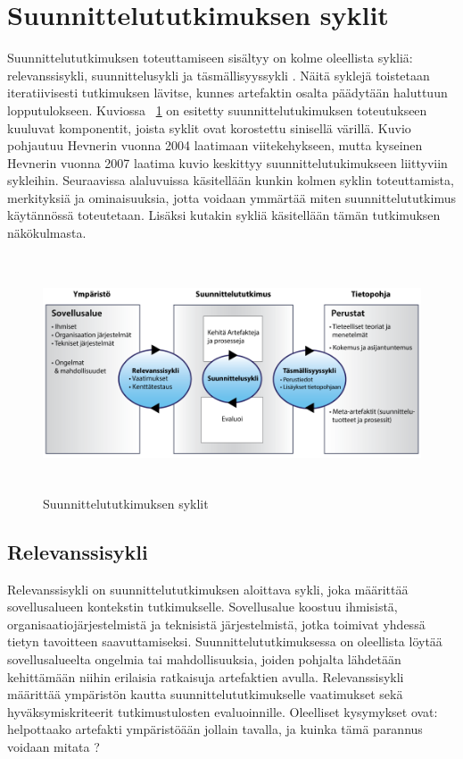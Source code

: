 \documentclass[utf8]{gradu3}
\begin{document}
%

\section{Suunnittelututkimuksen syklit}

Suunnittelututkimuksen toteuttamiseen sisältyy on kolme oleellista sykliä: relevanssisykli, suunnittelusykli ja täsmällisyyssykli \parencite[][]{cycles}. Näitä syklejä toistetaan iteratiivisesti tutkimuksen lävitse, kunnes artefaktin osalta päädytään haluttuun lopputulokseen. Kuviossa ~\ref{fig:dsr} on esitetty suunnittelutukimuksen toteutukseen kuuluvat komponentit, joista syklit ovat korostettu sinisellä värillä. Kuvio pohjautuu Hevnerin vuonna 2004 \parencite[][]{hevner2004} laatimaan viitekehykseen, mutta kyseinen Hevnerin vuonna 2007 \parencite[][]{cycles} laatima kuvio keskittyy suunnittelutukimukseen liittyviin sykleihin. Seuraavissa alaluvuissa käsitellään kunkin kolmen syklin toteuttamista, merkityksiä ja ominaisuuksia, jotta voidaan ymmärtää miten suunnittelututkimus käytännössä toteutetaan. Lisäksi kutakin sykliä käsitellään tämän tutkimuksen näkökulmasta.

\begin{figure}[h]\centering
  \includegraphics[height=7cm,keepaspectratio]{DSR}
  \caption[]{Suunnittelututkimuksen syklit}
  \label{fig:dsr}
\end{figure}

\subsection{Relevanssisykli}

Relevanssisykli on suunnittelututkimuksen aloittava sykli, joka määrittää sovellusalueen kontekstin tutkimukselle. Sovellusalue koostuu ihmisistä, organisaatiojärjestelmistä ja teknisistä järjestelmistä, jotka toimivat yhdessä tietyn tavoitteen saavuttamiseksi. Suunnittelututkimuksessa on oleellista löytää sovellusalueelta ongelmia tai mahdollisuuksia, joiden pohjalta lähdetään kehittämään niihin erilaisia ratkaisuja artefaktien avulla. Relevanssisykli määrittää ympäristön kautta suunnittelututkimukselle vaatimukset sekä hyväksymiskriteerit tutkimustulosten evaluoinnille. Oleelliset kysymykset ovat: helpottaako artefakti ympäristöään jollain tavalla, ja kuinka tämä parannus voidaan mitata \parencite[][]{cycles}?
\end{document}
